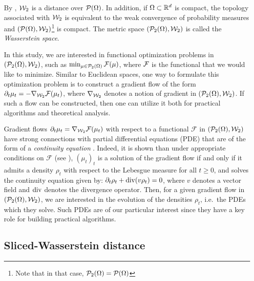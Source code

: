 %
By \cite[Proposition 7.1.5]{ambrosio2008gradient}, ${\cal W}_2$ is a distance over ${\cal P}(\Omega)$.
In addition, if $\Omega \subset \mathbb{R}^d$ is compact, the topology associated with ${\cal W}_2$ is equivalent to the weak convergence of probability measures and $({\cal P}(\Omega),{\cal W}_2)$\footnote{Note that in that case, ${\cal P}_2(\Omega)={\cal P}(\Omega)$} is compact. The metric space $({\cal P}_2(\Omega),{\cal W}_2) $ is called the \emph{Wasserstein space}.

In this study, we are interested in functional optimization problems in $({\cal P}_2(\Omega),{\cal W}_2)$, such as $\min_{\mu\in{\cal P}_2(\Omega)} {\cal F}(\mu)$, where ${\cal F}$ is the functional that we would like to minimize. Similar to Euclidean spaces, one way to formulate this optimization problem is to construct a gradient flow of the form $\partial_t \mu_t = - \nabla_{{\cal W}_2} {\cal F}(\mu_t)$, where $\nabla_{{\cal W}_2}$ denotes a notion of gradient in $({\cal P}_2(\Omega),{\cal W}_2)$. If such a flow can be constructed, then one can utilize it both for practical algorithms and theoretical analysis.

Gradient flows $\partial_t \mu_t = \nabla_{{\cal W}_2} \mathcal{F}(\mu_t)$ with respect to a functional $\mathcal{F}$ in $({\cal P}_2(\Omega),{\cal W}_2)$ have strong connections with partial differential equations (PDE) that are of the form of a \emph{continuity equation} \cite{santambrogio2017euclidean}. Indeed, it is shown than under appropriate conditions on $\mathcal{F}$ (see \eg \cite{ambrosio2008gradient}), $(\mu_t)_t$ is a solution of the gradient flow if and only if it admits a density $\rho_t$ with respect to the Lebesgue measure for all $t \geq 0$, and solves the continuity equation given by:
$\partial_t \rho_t + \operatorname{div} (v \rho_t) = 0$, %
where $v$ denotes a vector field and $\operatorname{div}$ denotes the divergence operator. Then, for a given gradient flow in $({\cal P}_2(\Omega),{\cal W}_2)$, we are interested in the evolution of the densities $\rho_t$, i.e.\ the PDEs which they solve.
%
Such PDEs are of our particular interest since they have a key role for building practical algorithms.




\subsection{Sliced-Wasserstein distance}

